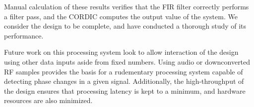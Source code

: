 \documentclass[11pt]{report}
\begin{document}
 Manual calculation of these results verifies that the FIR filter correctly performs a filter pass, and the CORDIC computes the output value of the system. We consider the design to be complete, and have conducted a thorough study of its performance. 
 
 Future work on this processing system look to allow interaction of the design using other data inputs aside from fixed numbers. Using audio or downconverted RF samples provides the basis for a rudementary processing system capable of detecting phase changes in a given signal. Additionally, the high-throughput of the design ensures that processing latency is kept to a minimum, and hardware resources are also minimized.
     
\end{document}
